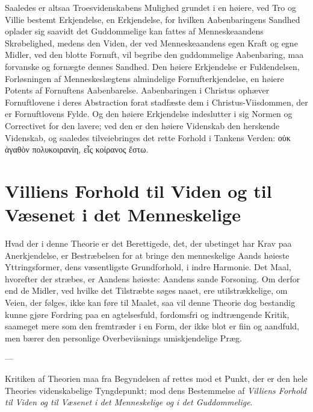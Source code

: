 \documentclass[12pt,a4paper]{book}
\newcommand{\opage}[1]{\marginnote{\footnotesize\textit{[#1]}}}
\begin{document}
Saaledes er altsaa Troesvidenskabens Mulighed grundet i en høiere, ved Tro og
Villie bestemt Erkjendelse, en Erkjendelse, for hvilken Aabenbaringens Sandhed
oplader sig saavidt det Guddommelige kan fattes af Menneskeaandens Skrøbelighed,
medens den Viden, der ved Menneskeaandens egen Kraft og egne Midler, ved den
blotte Fornuft, vil begribe den guddommelige Aabenbaring, maa forvanske og
fornægte dennes Sandhed. Den høiere Erkjendelse er Fuldendelsen, Forløsningen af
Menneskeslægtens almindelige Fornufterkjendelse, en høiere Potents af Fornuftens
Aabenbarelse. Aabenbaringen i Christus ophæver Fornuftlovene i deres Abstraction
forat stadfæste dem i Christus-Viisdommen, der er Fornuftlovens Fylde. Og den
høiere Erkjendelse indeslutter i sig Normen og Correctivet for den lavere; ved den
er den høiere Videnskab den herskende Videnskab, \opage{49}og saaledes tilveiebringes det
rette Forhold i Tankens Verden: οὐκ ἀγαθὸν πολυκοιρανίη, εἷς κοίρανος ἔστω.

\section{Villiens Forhold til Viden og til Væsenet i det Menneskelige}
\label{sec:villie-viden}

Hvad der i denne Theorie er det Berettigede, det, der ubetinget har Krav paa
Anerkjendelse, er Bestræbelsen for at bringe den menneskelige Aands høieste
Yttringsformer, dens væsentligste Grundforhold, i indre Harmonie. Det Maal,
hvorefter der stræbes, er Aandens høieste: Aandens sande Forsoning. Om derfor end
de Midler, ved hvilke det Tilstræbte søges naaet, ere utilstrækkelige, om Veien,
der følges, ikke kan føre til Maalet, saa vil denne Theorie dog bestandig kunne
gjøre Fordring paa en agtelsesfuld, fordomsfri og indtrængende Kritik, saameget
mere som den fremtræder i en Form, der ikke blot er fiin og aandfuld, men bærer
den personlige Overbeviisnings umiskjendelige Præg.

\begin{center}
---
\end{center}

Kritiken af Theorien maa fra Begyndelsen af rettes mod et Punkt, der er den hele
Theories videnskabelige Tyngdepunkt; mod dens Bestemmelse af \emph{Villiens Forhold til Viden og til Væsenet i det Menneskelige og i det Guddommelige}.
\end{document}
